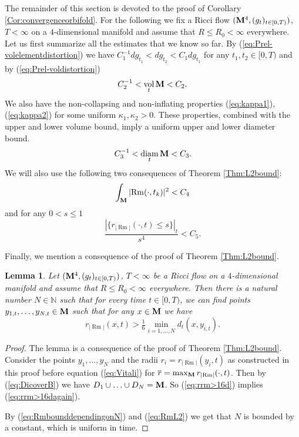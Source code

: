 \documentclass[11pt]{amsart}
\numberwithin{equation}{section}
\newtheorem{lemma}[theorem]{Lemma}
\def\M{{\bf M}}
\DeclareMathOperator{\diam}{diam}
\DeclareMathOperator{\Rm}{Rm}
\DeclareMathOperator{\vol}{vol}
\newcommand{\rrm}{r_{|{\Rm}|}}
\numberwithin{equation}{section}
\begin{document}
The remainder of this section is devoted to the proof of Corollary \ref{Cor:convergenceorbifold}.
For the following we fix a Ricci flow $(\M^4, (g_t)_{t \in [0,T)})$, $T < \infty$ on a $4$-dimensional manifold and assume that $R \leq R_0 < \infty$ everywhere.
Let us first summarize all the estimates that we know so far.
By (\ref{eq:Prel-volelementdistortion}) we have $C_1^{-1} dg_{t_1} < dg_{t_2} < C_1 dg_{t_1}$ for any $t_1, t_2 \in [0, T)$ and by (\ref{eq:Prel-voldistortion})
\[ C_2^{-1} < \vol_t \M < C_2. \]
We also have the non-collapsing and non-inflating properties (\ref{eq:kappa1}), (\ref{eq:kappa2}) for some uniform $\kappa_1, \kappa_2 > 0$.
These properties, combined with the upper and lower volume bound, imply a uniform upper and lower diameter bound.
\[ C_3^{-1} < \diam_t \M < C_3. \]
We will also use the following two consequences of Theorem \ref{Thm:L2bound}:
\begin{equation} \label{eq:RmL2}
 \int_{\M} |{\Rm}(\cdot, t_k)|^2 < C_4
\end{equation}
and for any $0 < s \leq 1$
\begin{equation} \label{eq:rrmvolboundC2}
\frac{| \{ \rrm(\cdot, t) \leq s \}|_{t}}{s^4} < C_5.
\end{equation}

Finally, we mention a consequence of the proof of Theorem \ref{Thm:L2bound}.

\begin{lemma} \label{Lem:yit}
Let $(\M^4, (g_t)_{t \in [0,T)})$, $T < \infty$ be a Ricci flow on a $4$-dimensional manifold and assume that $R \leq R_0 < \infty$ everywhere.
Then there is a natural number $N \in \mathbb{N}$ such that for every time $t \in [0,T)$, we can find points $y_{1,t}, \ldots, y_{N,t} \in \M$ such that for any $x \in \M$ we have
\begin{equation} \label{eq:rrm>16dagain}
 \rrm (x,t) > \tfrac16 \min_{i = 1, \ldots, N} d_t (x, y_{i,t}).
\end{equation}
\end{lemma}

\begin{proof}
The lemma is a consequence of the proof of Theorem \ref{Thm:L2bound}.
Consider the points $y_1, \ldots, y_N$ and the radii $r_i = \rrm (y_i, t)$ as constructed in this proof before equation (\ref{eq:Vitali}) for $\overline{r} = \max_{\M} \rrm (\cdot, t)$.
Then by (\ref{eq:DicoverB}) we have $D_1 \cup \ldots \cup D_N = \M$.
So (\ref{eq:rrm>16d}) implies (\ref{eq:rrm>16dagain}).

By (\ref{eq:RmbounddependingonN}) and (\ref{eq:RmL2}) we get that $N$ is bounded by a constant, which is uniform in time.
\end{proof}
\end{document}
